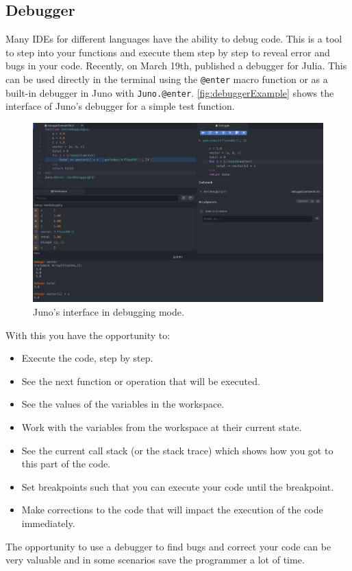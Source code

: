 \subsection{Debugger}
\label{sec:debugger}
Many IDEs for different languages have the ability to debug code. This is a tool to step into your functions and execute them step by step to reveal error and bugs in your code. Recently, on March 19th, \citet{Debugger} published a debugger for Julia. This can be used directly in the terminal using the \texttt{@enter} macro function or as a built-in debugger in Juno with \texttt{Juno.@enter}. \autoref{fig:debuggerExample} shows the interface of Juno's debugger for a simple test function.
\begin{figure}[htb]
    \centering
    \includegraphics[width = \textwidth]{figures/debugger_screenshot.png}
    \caption{Juno's interface in debugging mode.}
    \label{fig:debuggerExample}
\end{figure}
With this you have the opportunity to:
\begin{itemize}
    \item Execute the code, step by step.
    \item See the next function or operation that will be executed.
    \item See the values of the variables in the workspace.
    \item Work with the variables from the workspace at their current state.
    \item See the current call stack (or the stack trace) which shows how you got to this part of the code.
    \item Set breakpoints such that you can execute your code until the breakpoint.
    \item Make corrections to the code that will impact the execution of the code immediately.
\end{itemize}
The opportunity to use a debugger to find bugs and correct your code can be very valuable and in some scenarios save the programmer a lot of time. 

